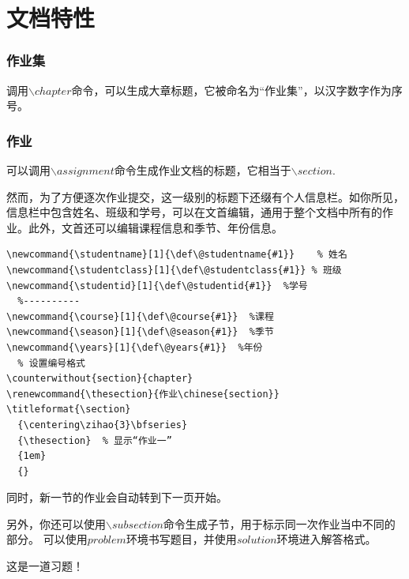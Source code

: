 \documentclass{template}
\begin{document}
\maketitle
\newpage
\thispagestyle{empty}
\null
\newpage 
\addtocounter{page}{-2}
\tableofcontents
\newpage
\thispagestyle{empty}
\null
\newpage 
{}
\chapter{文档特性}
\newpage
{}
\subsection{作业集}
调用$\backslash chapter$命令，可以生成大章标题，它被命名为“作业集”，以汉字数字作为序号。
\subsection{作业}
可以调用$\backslash assignment$命令生成作业文档的标题，它相当于$\backslash section$.

然而，为了方便逐次作业提交，这一级别的标题下还缀有个人信息栏。如你所见，信息栏中包含姓名、班级和学号，可以在文首编辑，通用于整个文档中所有的作业。此外，文首还可以编辑课程信息和季节、年份信息。
\begin{lstlisting}[title=\ ,frame=single]
  %个人信息设置
\newcommand{\studentname}[1]{\def\@studentname{#1}}    % 姓名
\newcommand{\studentclass}[1]{\def\@studentclass{#1}} % 班级
\newcommand{\studentid}[1]{\def\@studentid{#1}}  %学号
  %----------
\newcommand{\course}[1]{\def\@course{#1}}  %课程
\newcommand{\season}[1]{\def\@season{#1}}  %季节
\newcommand{\years}[1]{\def\@years{#1}}  %年份
  % 设置编号格式
\counterwithout{section}{chapter}
\renewcommand{\thesection}{作业\chinese{section}}
\titleformat{\section}
  {\centering\zihao{3}\bfseries}
  {\thesection}  % 显示“作业一”
  {1em}
  {}
\end{lstlisting}

同时，新一节的作业会自动转到下一页开始。

另外，你还可以使用$\backslash subsection$命令生成子节，用于标示同一次作业当中不同的部分。
可以使用$problem$环境书写题目，并使用$solution$环境进入解答格式。
\begin{problem}
    这是一道习题！
\end{problem}
\end{document}
